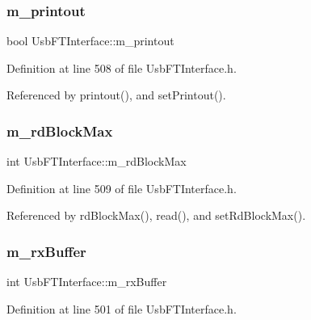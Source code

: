 \subsubsection{\texorpdfstring{m\+\_\+printout}{m\_printout}}
{\footnotesize\ttfamily bool Usb\+F\+T\+Interface\+::m\+\_\+printout\hspace{0.3cm}{\ttfamily [private]}}



Definition at line 508 of file Usb\+F\+T\+Interface.\+h.



Referenced by printout(), and set\+Printout().

\mbox{\label{classUsbFTInterface_a0f5050f1ed93392c8e5e4acaf7b75e1c}} 
\subsubsection{\texorpdfstring{m\+\_\+rd\+Block\+Max}{m\_rdBlockMax}}
{\footnotesize\ttfamily int Usb\+F\+T\+Interface\+::m\+\_\+rd\+Block\+Max\hspace{0.3cm}{\ttfamily [private]}}



Definition at line 509 of file Usb\+F\+T\+Interface.\+h.



Referenced by rd\+Block\+Max(), read(), and set\+Rd\+Block\+Max().

\mbox{\label{classUsbFTInterface_a7007c5112d381f5caefa133a42bd900d}} 
\subsubsection{\texorpdfstring{m\+\_\+rx\+Buffer}{m\_rxBuffer}}
{\footnotesize\ttfamily int Usb\+F\+T\+Interface\+::m\+\_\+rx\+Buffer\hspace{0.3cm}{\ttfamily [private]}}



Definition at line 501 of file Usb\+F\+T\+Interface.\+h.



